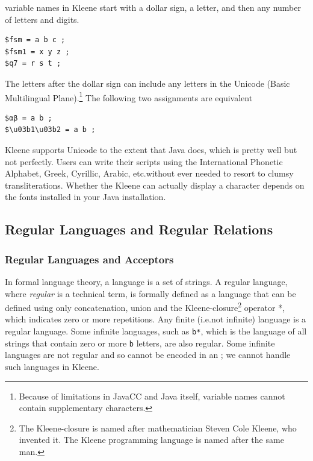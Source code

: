 \fsm{} variable names in Kleene start with a dollar sign, a letter, and then any number of
letters and digits.


\begin{Verbatim}
$fsm = a b c ;
$fsm1 = x y z ;
$q7 = r s t ;
\end{Verbatim}

\noindent
The letters after the dollar sign can include any letters in the Unicode  (Basic
Multilingual Plane).\footnote{Because of limitations in JavaCC and Java itself, variable
names cannot contain supplementary characters.}  The following two assignments are equivalent 


\begin{Verbatim}
$αβ = a b ;
$\u03b1\u03b2 = a b ;
\end{Verbatim}

Kleene supports Unicode to the extent that Java does, which is pretty well but not
perfectly.  Users can write their scripts using the International Phonetic Alphabet, Greek,
Cyrillic, Arabic, etc.\@ without ever needed to resort to clumsy transliterations.
Whether the Kleene \gui{} can actually display a character depends on the fonts installed in
your Java installation.

\subsection{Regular Languages and Regular Relations}

\subsubsection{Regular Languages and Acceptors}

In formal language theory, a language is a set of strings.  A regular language, where
\emph{regular} is a technical term, is formally defined as a language that can be defined
using only concatenation, union and the Kleene-closure\footnote{The Kleene-closure is named
after mathematician Steven Cole Kleene, who invented it.  The Kleene programming language
is named after the same man.} operator *, which indicates zero or
more repetitions.  Any finite (i.e.\@ not infinite) language is a regular language.  Some infinite languages,
such as \verb!b*!, which is the language of all strings that contain zero or more
\texttt{b} letters, are also regular.  Some infinite languages are not regular
and so cannot be encoded in an \fsm{}; we cannot handle such languages in Kleene.

